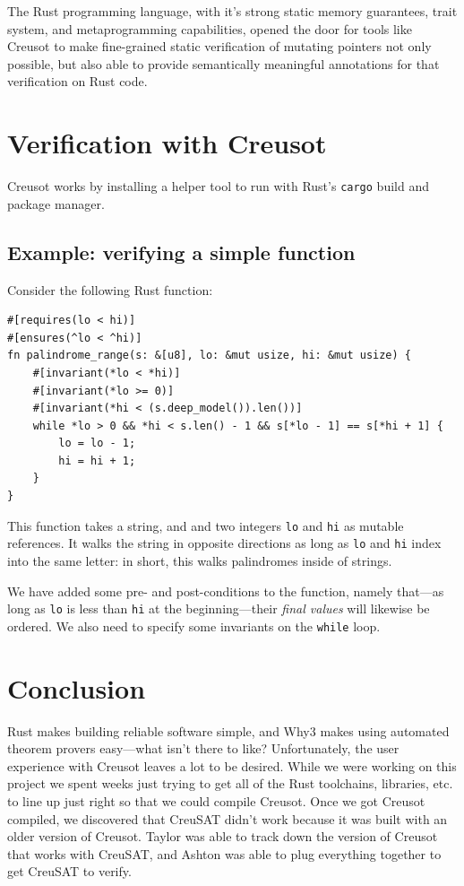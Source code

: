 \documentclass[12pt]{article}
\begin{document}
The Rust programming language, with it's strong static memory guarantees, trait system, and metaprogramming capabilities,
opened the door for tools like Creusot to make fine-grained static verification of mutating pointers not only possible, but also able to provide
semantically meaningful annotations for that verification on Rust code.

\section{Verification with Creusot}

Creusot works by installing a helper tool to run with Rust's \texttt{cargo} build and package manager.

\subsection{Example: verifying a simple function}

Consider the following Rust function:

\begin{verbatim}
#[requires(lo < hi)]
#[ensures(^lo < ^hi)]
fn palindrome_range(s: &[u8], lo: &mut usize, hi: &mut usize) {
    #[invariant(*lo < *hi)]
    #[invariant(*lo >= 0)]
    #[invariant(*hi < (s.deep_model()).len())]
    while *lo > 0 && *hi < s.len() - 1 && s[*lo - 1] == s[*hi + 1] {
        lo = lo - 1;
        hi = hi + 1;
    }
}
\end{verbatim}

This function takes a string, and and two integers \texttt{lo} and \texttt{hi} as mutable references.
It walks the string in opposite directions as long as \texttt{lo} and \texttt{hi} index into the same letter: in short, this walks palindromes inside of strings.

We have added some pre- and post-conditions to the function, namely that---as long as \texttt{lo} is less than \texttt{hi} at the beginning---their \emph{final values} will likewise be ordered.
We also need to specify some invariants on the \texttt{while} loop.

\section{Conclusion}

Rust makes building reliable software simple, and Why3 makes using automated theorem provers easy---what isn't there to like?
Unfortunately, the user experience with Creusot leaves a lot to be desired.
While we were working on this project we spent weeks just trying to get all of the Rust toolchains, libraries, etc. to line up just right so that we could compile Creusot.
Once we got Creusot compiled, we discovered that CreuSAT didn't work because it was built with an older version of Creusot.
Taylor was able to track down the version of Creusot that works with CreuSAT, and Ashton was able to plug everything together to get CreuSAT to verify.
\end{document}
